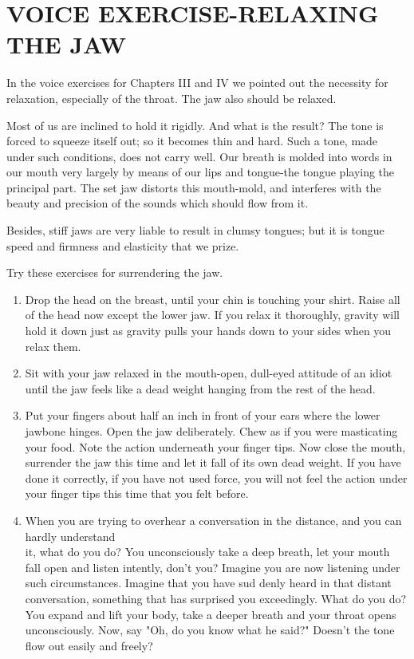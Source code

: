 \documentclass[10pt]{article}
\begin{document}
\section*{VOICE EXERCISE-RELAXING THE JAW}
In the voice exercises for Chapters III and IV we pointed out the necessity for relaxation, especially of the throat. The jaw also should be relaxed.

Most of us are inclined to hold it rigidly. And what is the result? The tone is forced to squeeze itself out; so it becomes thin and hard. Such a tone, made under such conditions, does not carry well. Our breath is molded into words in our mouth very largely by means of our lips and tongue-the tongue playing the principal part. The set jaw distorts this mouth-mold, and interferes with the beauty and precision of the sounds which should flow from it.

Besides, stiff jaws are very liable to result in clumsy tongues; but it is tongue speed and firmness and elasticity that we prize.

Try these exercises for surrendering the jaw.

\begin{enumerate}
  \item Drop the head on the breast, until your chin is touching your shirt. Raise all of the head now except the lower jaw. If you relax it thoroughly, gravity will hold it down just as gravity pulls your hands down to your sides when you relax them.
  \item Sit with your jaw relaxed in the mouth-open, dull-eyed attitude of an idiot until the jaw feels like a dead weight hanging from the rest of the head.
  \item Put your fingers about half an inch in front of your ears where the lower jawbone hinges. Open the jaw deliberately. Chew as if you were masticating your food. Note the action underneath your finger tips. Now close the mouth, surrender the jaw this time and let it fall of its own dead weight. If you have done it correctly, if you have not used force, you will not feel the action under your finger tips this time that you felt before.
  \item When you are trying to overhear a conversation in the distance, and you can hardly understand\\
it, what do you do? You unconsciously take a deep breath, let your mouth fall open and listen intently, don't you? Imagine you are now listening under such circumstances. Imagine that you have sud denly heard in that distant conversation, something that has surprised you exceedingly. What do you do? You expand and lift your body, take a deeper breath and your throat opens unconsciously. Now, say "Oh, do you know what he said?" Doesn't the tone flow out easily and freely?
\end{enumerate}
\end{document}
